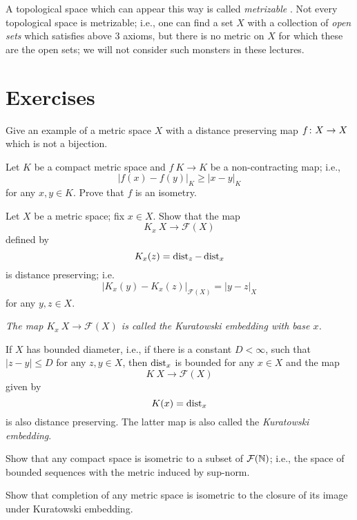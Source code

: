 A topological space which can appear this way is called \emph{metrizable}%
.
Not every topological space is metrizable;
i.e., one can find a set $X$ with a collection of \textit{open sets}
which satisfies above 3 axioms, but there is no metric on $X$ for which these are the open sets; 
we will not consider such monsters in these lectures.




\section*{Exercises}

\begin{pr}\label{pr:nonisometry}
Give an example of a metric space $X$ with a distance preserving map $f\:X\z\to X$ which is not a bijection. 
\end{pr}

\begin{pr}\label{pr:non-contracting=>isometry}
Let $K$  be a compact metric space and
$f\:K\to K$ be a non-contracting map;
i.e., 
$$|f(x)-f(y)|_K\ge |x-y|_K$$
for any $x,y\in K$.
Prove that $f$ is an isometry.
\end{pr}



\begin{pr}\label{ex:kuratowski}
Let $X$ be a metric space; fix $x\in X$.
Show that the map 
$$K_x\: X\to\mathcal{F}(X)$$ 
defined by 
$$K_x(z) = \operatorname{dist}_z-\operatorname{dist}_x$$
is distance preserving;
i.e. 
$$|K_x(y)-K_x(z)|_{\mathcal{F}(X)}=|y-z|_X$$
for any $y,z\in X$.
\end{pr}

{\it The map $K_x\: X\to\mathcal{F}(X)$ is called the \emph{Kuratowski embedding with base $x$}.

If $X$ has bounded diameter, i.e., if there is a constant $D<\infty$,
such that $|z-y|\le D$ for any $z,y\in X$,
then $\operatorname{dist}_x$ is bounded for any $x\in X$
and the map 
$$K\:X\to\mathcal{F}(X)$$ given by $$K(x) = \operatorname{dist}_x $$ 
is also distance preserving.
The latter map is also called the \emph{Kuratowski embedding}.}

\begin{pr}\label{pr:compact->F_N}
Show that any compact space is isometric to a subset of $\mathcal{F}(\mathbb{N})$;
i.e., the space of bounded sequences with the metric induced by sup-norm.
\end{pr}

\begin{pr}\label{pr:complition-kuratowski}
Show that completion of any metric space is isometric to the closure of its image under Kuratowski embedding.
\end{pr}

